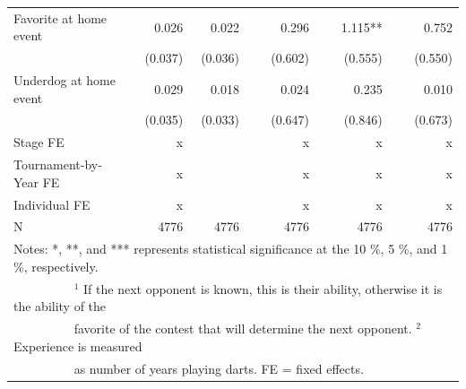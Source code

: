 \documentclass[11pt,a4paper]{article}
\begin{document}
\begin{table}[H]
\begin{tabular}{l r r r r r r r r}
			Favorite at home event     &   0.026   & 0.022       & &  0.296     & &  1.115**   & & 0.752    \\
			                           &  (0.037)  & (0.036)     & &  (0.602)   & &  (0.555)   & & (0.550)  \\
			Underdog at home event     &   0.029   & 0.018       & &   0.024    & &  0.235     & & 0.010    \\
			                           &   (0.035) & (0.033)     & &  (0.647)   & &  (0.846)   & & (0.673)  \\
			\midrule
			Stage FE    &     x     &             & &  x         & &  x         & & x       \\ 
			Tournament-by-Year FE      &     x     &             & &  x         & &  x         & & x       \\
			Individual FE              &   x       &             & &  x         & & x          & & x       \\
			\midrule 
            N                          &   4776    &    4776     & &   4776     & &   4776     & & 4776    \\ 
			\bottomrule \bottomrule
			\multicolumn{9}{l}{\footnotesize Notes: *, **, and *** represents statistical significance at the 10 \%, 5 \%, and 1 \%, respectively. }\\
			\multicolumn{9}{l}{\footnotesize ~~~~~~~~~ $^{1}$ If the next opponent is known, this is their ability, otherwise it is the ability of the }\\
			\multicolumn{9}{l}{\footnotesize ~~~~~~~~~  favorite of the contest that will determine the next opponent. $^{2}$ Experience is measured }\\
			\multicolumn{9}{l}{\footnotesize ~~~~~~~~~ as number of years playing darts. FE = fixed effects.}
		\end{tabular}
	\end{table}
\end{document}
